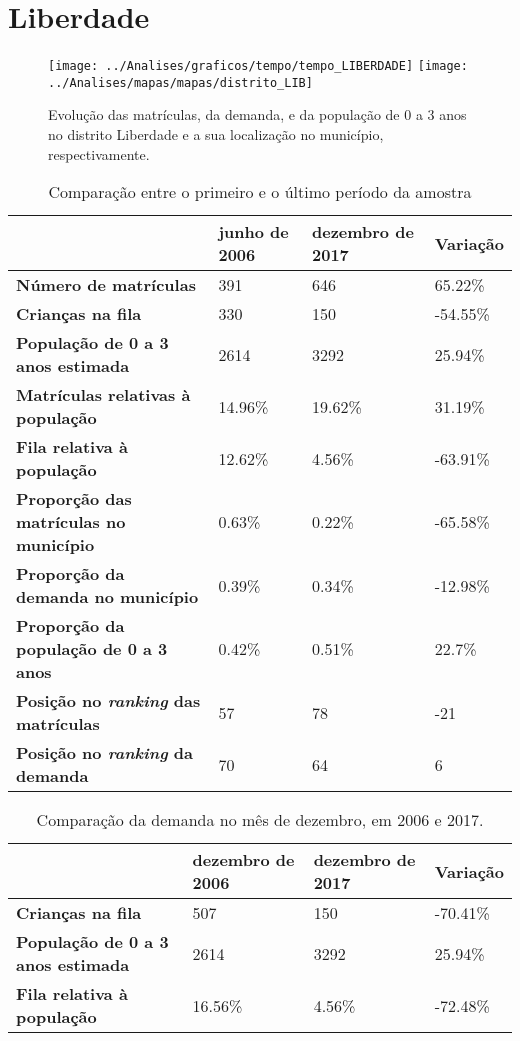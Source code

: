 \section{Liberdade}
\begin{figure}[H]
	\centering
	\texttt{[image: ../Analises/graficos/tempo/tempo\_LIBERDADE]}
	\texttt{[image: ../Analises/mapas/mapas/distrito\_LIB]}
	\caption{Evolução das matrículas, da demanda, e da população de 0 a 3 anos no distrito Liberdade e a sua localização no município, respectivamente.}
\end{figure}
\begin{table}[H]
	\begin{tabular}{|l|l|l|l|}
		\hline
		\textbf{}                                      & \textbf{junho de 2006}       & \textbf{dezembro de 2017}    & \textbf{Variação} \\ \hline
		\textbf{Número de matrículas}                  & 391 & 646 & 65.22\% \\ \hline
		\textbf{Crianças na fila}                      & 330 & 150 & -54.55\% \\ \hline
		\textbf{População de 0 a 3 anos estimada}      & 2614 & 3292 & 25.94\% \\ \hline
		\textbf{Matrículas relativas à população}      & 14.96\% & 19.62\% & 31.19\% \\ \hline
		\textbf{Fila relativa à população}             & 12.62\% & 4.56\% & -63.91\% \\ \hline
		\textbf{Proporção das matrículas no município} & 0.63\% & 0.22\% & -65.58\% \\ \hline
		\textbf{Proporção da demanda no município}     & 0.39\% & 0.34\% & -12.98\% \\ \hline
		\textbf{Proporção da população de 0 a 3 anos}  & 0.42\% & 0.51\% & 22.7\% \\ \hline
		\textbf{Posição no \textit{ranking} das matrículas}     & 57 & 78 & -21 \\ \hline
		\textbf{Posição no \textit{ranking} da demanda}         & 70 & 64 & 6 \\ \hline
	\end{tabular}
	\caption{Comparação entre o primeiro e o último período da amostra}
\end{table}
\begin{table}[H]
	\begin{tabular}{|l|l|l|l|}
		\hline
		\textbf{}                                 & \textbf{dezembro de 2006} & \textbf{dezembro de 2017} & \textbf{Variação} \\ \hline
		\textbf{Crianças na fila}                      & 507 & 150 & -70.41\% \\ \hline
		\textbf{População de 0 a 3 anos estimada}      & 2614 & 3292 & 25.94\% \\ \hline
		\textbf{Fila relativa à população}             & 16.56\% & 4.56\% & -72.48\% \\ \hline
	\end{tabular}
	\caption{Comparação da demanda no mês de dezembro, em 2006 e 2017.}
\end{table}
